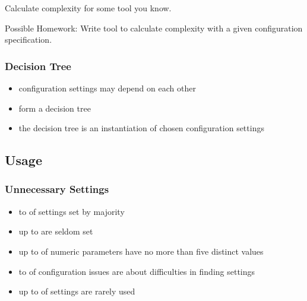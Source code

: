 \documentclass{beamer}
\begin{document}
\begin{assignment}
	\begin{task}
	Calculate complexity for some tool you know.
	\end{task}

	\begin{task}
	Possible Homework: Write tool to calculate complexity with a given configuration specification.
	\end{task}
\end{assignment}

\begin{frame}
	\frametitle{Decision Tree}
	\begin{itemize}
	\item configuration settings may depend on each other
	\item form a decision tree~\cite{reiser2009cvm,czarnecki2012cool}
	\item the decision tree is an instantiation of chosen configuration settings
	\end{itemize}
\end{frame}

\subsection{Usage}

\begin{frame}
	\frametitle{Unnecessary Settings~\cite{xu2015hey}}
	\begin{itemize}
	\item {} to  of settings set by majority
	\item up to  are seldom set
	\item up to  of numeric parameters have no more than five distinct values
	\item {} to  of configuration issues are about difficulties in finding settings
	\item up to  of settings are rarely used
	\end{itemize}
\end{frame}
\end{document}
